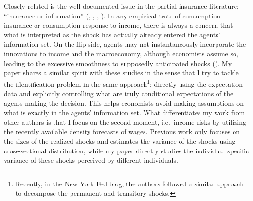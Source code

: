 Closely related is the well documented issue in the partial insurance literature: ``insurance or information''
(\cite{pistaferri_superior_2001},
\cite{kaufmann_disentangling_2009}, \cite{meghir2011earnings}, \cite{kaplan2010much}). In any
empirical tests of consumption insurance or consumption response to
income, there is always a concern that what is interpreted as the shock
has actually already entered the agents' information set. On the flip side, agents may not instantaneously incorporate the innovations to income and the macroeconomy, although economists assume so, leading to the excessive smoothness to supposedly anticipated shocks (\cite{flavin_excess_1988}). My paper shares a similar spirit with these studies in the sense that I try to tackle the identification problem in the same approach\footnote{Recently, in the New York Fed \href{https://libertystreeteconomics.newyorkfed.org/2017/11/understanding-permanent-and-temporary-income-shocks.html}{blog},
the authors followed a similar approach to decompose the permanent and transitory shocks.}: directly using the expectation data and explicitly controlling what are truly conditional expectations of the agents making the decision. This helps economists avoid making assumptions on what is exactly in the agents' information set. What differentiates my work from other authors is that I focus on the second moment, i.e.~income risks by utilizing the recently available density forecasts of wages. Previous work only focuses on the sizes of the realized shocks and estimates the variance of the shocks using cross-sectional distribution, while my paper directly studies the individual specific variance of these shocks perceived by different individuals.

